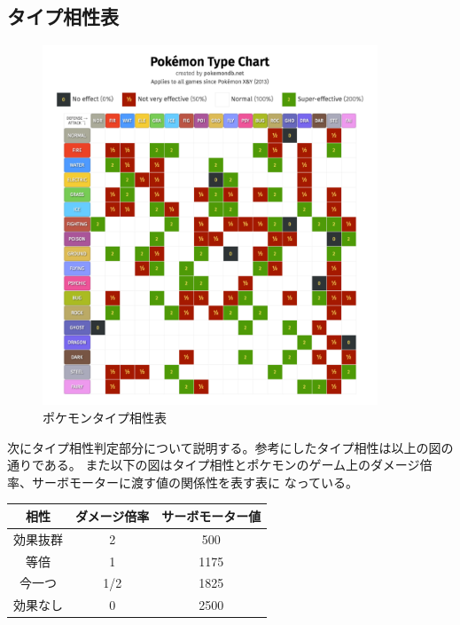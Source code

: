 \documentclass[a4paper,titlepage,11pt]{ltjsarticle}
\begin{document}
\subsection{タイプ相性表}
\begin{figure}[H]
  \begin{center}
    \includegraphics[width=100mm]{typechart.pdf}
    \caption{ポケモンタイプ相性表\cite{typechart}}
  \end{center}
\end{figure}
次にタイプ相性判定部分について説明する。参考にしたタイプ相性は以上の図の通りである。
また以下の図はタイプ相性とポケモンのゲーム上のダメージ倍率、サーボモーターに渡す値の関係性を表す表に
なっている。

\begin{tabular}{|c|c|c|}\hline
  相性 & ダメージ倍率 & サーボモーター値 \\ \hline
  効果抜群 & 2 & 500 \\ \hline
  等倍 & 1 & 1175 \\ \hline
  今一つ & 1/2 & 1825 \\ \hline
  効果なし & 0 & 2500 \\ \hline
\end{tabular}
\end{document}
